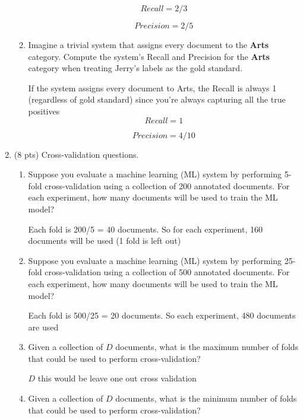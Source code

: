 \documentclass[11pt]{article}
\begin{document}
\begin{enumerate}
\begin{enumerate}
  $$Recall = 2/3$$
  
  $$Precision = 2/5$$

\item Imagine a trivial system  that assigns  every document to the
  {\bf Arts} category. Compute the system's Recall and Precision for the {\bf
    Arts} category when treating Jerry's labels as the gold standard.
    
  If the system assigns every document to Arts, the Recall is always 1 (regardless of gold standard) since you're always capturing all the true positives  
  $$Recall = 1$$
  
  $$Precision = 4/10$$

\end{enumerate}


\newpage

\item (8 pts) Cross-validation questions.

\begin{enumerate}

\item Suppose you evaluate a machine learning (ML) system by
  performing 5-fold cross-validation using a collection of 200
  annotated documents. For each experiment, how many documents will be
  used to train the ML model?
  
  Each fold is 200/5 = 40 documents. So for each experiment, 160 documents will be used (1 fold is left out)

\item Suppose you evaluate a machine learning (ML) system by
  performing 25-fold cross-validation using a collection of 500
  annotated documents. For each experiment, how many documents will be
  used to train the ML model?
  
  Each fold is 500/25 = 20 documents. So each experiment, 480 documents are used

\item Given a collection of $D$ documents, what is the maximum number of
  folds that could be used to perform cross-validation?
  
  $D$ this would be leave one out cross validation

\item Given a collection of $D$ documents, what is the minimum number of
  folds that could be used to perform cross-validation? 
  

\end{enumerate}
\end{enumerate}
\end{document}
